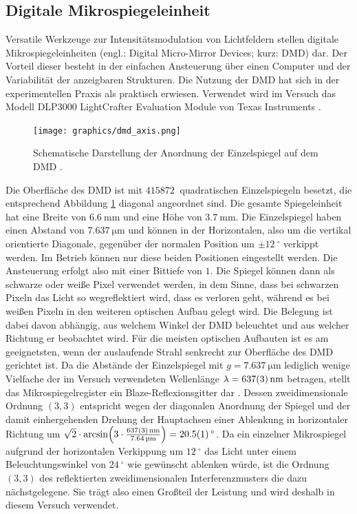 \documentclass[
class=book,
accentcolor=1b,
custommargins=geometry,
fontsize=11pt,
thesis={type=Versuchsanleitung},
ruledheaders=all,
headline=false,
instbox=false,
marginpar=false,
title=small,
ignore-missing-data=true,
twoside=false,
pdfa=false %
]{apqpub}
\begin{document}
	\subsection{Digitale Mikrospiegeleinheit}
Versatile Werkzeuge zur Intensitätsmodulation von Lichtfeldern stellen digitale Mikrospiegeleinheiten (engl.: Digital Micro-Mirror Devices; kurz: DMD) dar.
Der Vorteil dieser besteht in der einfachen Ansteuerung über einen Computer und der Variabilität der anzeigbaren Strukturen.
Die Nutzung der DMD hat sich in der experimentellen Praxis als praktisch erwiesen.
Verwendet wird im Versuch das Modell DLP3000 LightCrafter Evaluation Module von Texas Instruments \cite{manual:DMD}.
\begin{figure}
\centering
    \texttt{[image: graphics/dmd\_axis.png]}
\caption{Schematische Darstellung der Anordnung der Einzelspiegel auf dem DMD \protect\cite{manual:DMD}.}
\label{fig:dmdanordnung}
\end{figure}
Die Oberfläche des DMD ist mit $\SI{415872}{}$ quadratischen Einzelspiegeln besetzt, die entsprechend Abbildung \ref{fig:dmdanordnung} diagonal angeordnet sind.
Die gesamte Spiegeleinheit hat eine Breite von $\SI{6.6}{\milli \metre}$ und eine Höhe von $\SI{3.7}{\milli \metre}$.
Die Einzelspiegel haben einen Abstand  von $\SI{7.637}{\micro\metre}$ und können in der Horizontalen, also um die vertikal orientierte Diagonale, gegenüber der normalen Position um $\pm \SI{12}{^\circ}$ verkippt werden.
Im Betrieb können nur diese beiden Positionen eingestellt werden.
Die Ansteuerung erfolgt also mit einer Bittiefe von $1$.
Die Spiegel können dann als \glqq schwarze\grqq{} oder \glqq weiße\grqq{} Pixel verwendet werden, in dem Sinne, dass bei schwarzen Pixeln das Licht so wegreflektiert wird, dass es verloren geht, während es bei weißen Pixeln in den weiteren optischen Aufbau gelegt wird.
Die Belegung ist dabei davon abhängig, aus welchem Winkel der DMD beleuchtet und aus welcher Richtung er beobachtet wird.
Für die meisten optischen Aufbauten ist es am geeignetsten, wenn der auslaufende Strahl senkrecht zur Oberfläche des DMD gerichtet ist.
Da die Abstände der Einzelspiegel mit $g = \SI{7.637}{\micro\metre}$ lediglich wenige Vielfache der im Versuch verwendeten Wellenlänge $\lambda = \SI{637 \pm 3}{\nano\metre}$ betragen, stellt das Mikrospiegelregister ein Blaze-Reflexionsgitter dar \cite[S. 947 -- 954]{Hecht}.
Dessen zweidimensionale Ordnung $\left( 3 , 3 \right)$ entspricht wegen der diagonalen Anordnung der Spiegel und der damit einhergehenden Drehung der Hauptachsen einer Ablenkung in horizontaler Richtung um $\sqrt{2} \cdot \arcsin \!\left(3 \cdot \frac{\SI{637 \pm 3}{\nano\metre}}{\SI{7.64}{\micro\metre}} \right) = \SI{20.5 \pm 0.1}{^\circ}$.
Da ein einzelner Mikrospiegel aufgrund der horizontalen Verkippung um $\SI{12}{^\circ}$ das Licht unter einem Beleuchtungswinkel von $\SI{24}{^\circ}$ wie gewünscht ablenken würde, ist die Ordnung $\left( 3 , 3 \right)$ des reflektierten zweidimensionalen Interferenzmusters die dazu nächstgelegene.
Sie trägt also einen Großteil der Leistung und wird deshalb in diesem Versuch verwendet.
\end{document}
